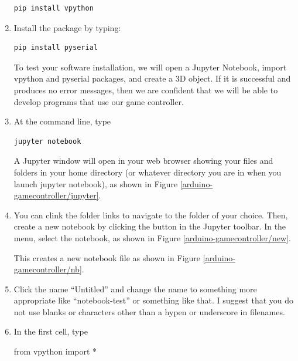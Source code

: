 \begin{enumerate}
\begin{verbatim}
pip install vpython
\end{verbatim}

\item Install the  package by typing:

\begin{verbatim}
pip install pyserial
\end{verbatim}

To test your software installation, we will open a Jupyter Notebook, import vpython and pyserial packages, and create a 3D object. If it is successful and produces no error messages, then we are confident that we will be able to develop programs that use our game controller.

\item At the command line, type

\begin{verbatim}
jupyter notebook
\end{verbatim}

A Jupyter window will open in your web browser showing your files and folders in your home directory (or whatever directory you are in when you launch jupyter notebook), as shown in Figure \ref{arduino-gamecontroller/jupyter}. 


\item You can clink the folder links to navigate to the folder of your choice. Then, create a new notebook by clicking the  button in the Jupyter toolbar. In the menu, select the  notebook, as shown in Figure \ref{arduino-gamecontroller/new}.


This creates a new notebook file as shown in Figure \ref{arduino-gamecontroller/nb}. 


\item Click the name ``Untitled'' and change the name to something more appropriate like ``notebook-test'' or something like that. I suggest that you do not use blanks or characters other than a hypen or underscore in filenames.

\item In the first cell, type

\begin{myvpython}
from vpython import *
\end{myvpython}


\end{enumerate}
